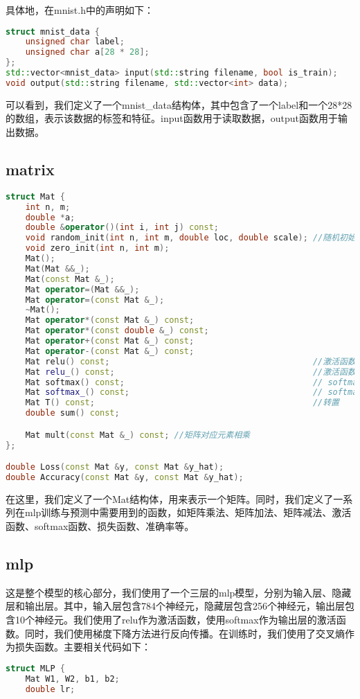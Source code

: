 \documentclass{ctexart}
\begin{document}
\begin{sloppypar}
具体地，在mnist.h中的声明如下：
\begin{lstlisting}[language=C++]
struct mnist_data {
    unsigned char label;
    unsigned char a[28 * 28];
};
std::vector<mnist_data> input(std::string filename, bool is_train);
void output(std::string filename, std::vector<int> data);
\end{lstlisting}

可以看到，我们定义了一个mnist\_data结构体，其中包含了一个label和一个28*28的数组，表示该数据的标签和特征。input函数用于读取数据，output函数用于输出数据。
\subsection{matrix}
\begin{lstlisting}[language=C++]
struct Mat {
    int n, m;
    double *a;
    double &operator()(int i, int j) const;
    void random_init(int n, int m, double loc, double scale); //随机初始化
    void zero_init(int n, int m);
    Mat();
    Mat(Mat &&_);
    Mat(const Mat &_);
    Mat operator=(Mat &&_);
    Mat operator=(const Mat &_);
    ~Mat();
    Mat operator*(const Mat &_) const;
    Mat operator*(const double &_) const;
    Mat operator+(const Mat &_) const;
    Mat operator-(const Mat &_) const;
    Mat relu() const;                                         //激活函数
    Mat relu_() const;                                        //激活函数的导数
    Mat softmax() const;                                      // softmax函数
    Mat softmax_() const;                                     // softmax函数的导数
    Mat T() const;                                            //转置
    double sum() const;

    Mat mult(const Mat &_) const; //矩阵对应元素相乘
};

double Loss(const Mat &y, const Mat &y_hat);
double Accuracy(const Mat &y, const Mat &y_hat);

\end{lstlisting}
在这里，我们定义了一个Mat结构体，用来表示一个矩阵。同时，我们定义了一系列在mlp训练与预测中需要用到的函数，如矩阵乘法、矩阵加法、矩阵减法、激活函数、softmax函数、损失函数、准确率等。
\subsection{mlp}
这是整个模型的核心部分，我们使用了一个三层的mlp模型，分别为输入层、隐藏层和输出层。其中，输入层包含784个神经元，隐藏层包含256个神经元，输出层包含10个神经元。我们使用了relu作为激活函数，使用softmax作为输出层的激活函数。同时，我们使用梯度下降方法进行反向传播。在训练时，我们使用了交叉熵作为损失函数。主要相关代码如下：
\begin{lstlisting}[language=C++]
struct MLP {
    Mat W1, W2, b1, b2;
    double lr;


\end{lstlisting}
\end{sloppypar}
\end{document}
